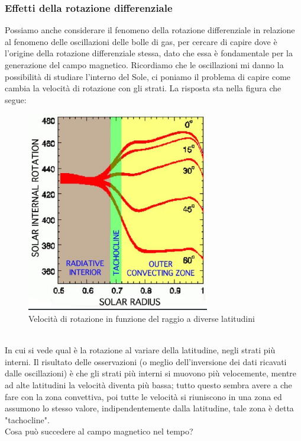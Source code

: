 \documentclass[a4paper,11pt]{article}
\begin{document}
    \subsubsection{Effetti della rotazione differenziale}
        Possiamo anche considerare il fenomeno della rotazione differenziale in relazione al fenomeno delle oscillazioni delle bolle di gas, per cercare di capire dove è l'origine della rotazione differenziale stessa, dato che essa è fondamentale per la generazione del campo magnetico.
        Ricordiamo che le oscillazioni mi danno la possibilità di studiare l'interno del Sole, ci poniamo il problema di capire come cambia la velocità di rotazione con gli strati.
        La risposta sta nella figura che segue:
        \\
        \begin{figure}[h!!]
            \centering
                \includegraphics[width=8cm]{2dic/Tachocline.jpg}
                \caption{Velocità di rotazione in funzione del raggio a diverse latitudini}
            \label{fig:VelRotDiff}
        \end{figure}
        \\
        In cui si vede qual è la rotazione al variare della latitudine, negli strati più interni.
        Il risultato delle osservazioni (o meglio dell'inversione dei dati ricavati dalle oscillazioni) è che gli strati più interni si muovono più velocemente, mentre ad alte latitudini la velocità diventa più bassa; tutto questo sembra avere a che fare con la zona convettiva, poi tutte le velocità si riuniscono in una zona ed assumono lo stesso valore, indipendentemente dalla latitudine, tale zona è detta "tachocline". \\
        Cosa può succedere al campo magnetico nel tempo? \\
\end{document}

